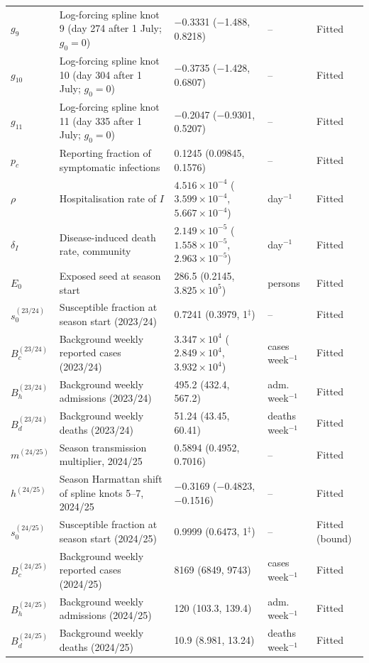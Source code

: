 \documentclass[12pt,a4paper]{article}
\theoremstyle{definition}
\theoremstyle{remark}
\begin{document}
\begin{longtable}{p{1.5cm}p{4.6cm}p{4.3cm}p{1.9cm}p{2.0cm}}
$g_{9}$ & Log-forcing spline knot 9 (day 274 after 1 July; $g_0=0$) & $-$0.3331 ($-$1.488, 0.8218) & -- & Fitted\\
$g_{10}$ & Log-forcing spline knot 10 (day 304 after 1 July; $g_0=0$) & $-$0.3735 ($-$1.428, 0.6807) & -- & Fitted\\
$g_{11}$ & Log-forcing spline knot 11 (day 335 after 1 July; $g_0=0$) & $-$0.2047 ($-$0.9301, 0.5207) & -- & Fitted\\
$p_c$ & Reporting fraction of symptomatic infections & 0.1245 (0.09845, 0.1576) & -- & Fitted\\
$\rho$ & Hospitalisation rate of $I$ & $4.516\times10^{-4}$ ($3.599\times10^{-4}$, $5.667\times10^{-4}$) & day$^{-1}$ & Fitted\\
$\delta_I$ & Disease-induced death rate, community & $2.149\times10^{-5}$ ($1.558\times10^{-5}$, $2.963\times10^{-5}$) & day$^{-1}$ & Fitted\\
$E_0$ & Exposed seed at season start & 286.5 (0.2145, $3.825\times10^{5}$) & persons & Fitted\\
$s_0^{(23/24)}$ & Susceptible fraction at season start (2023/24) & 0.7241 (0.3979, 1$^{\ddagger}$) & -- & Fitted\\
$B_c^{(23/24)}$ & Background weekly reported cases (2023/24) & $3.347\times10^{4}$ ($2.849\times10^{4}$, $3.932\times10^{4}$) & cases week$^{-1}$ & Fitted\\
$B_h^{(23/24)}$ & Background weekly admissions (2023/24) & 495.2 (432.4, 567.2) & adm. week$^{-1}$ & Fitted\\
$B_d^{(23/24)}$ & Background weekly deaths (2023/24) & 51.24 (43.45, 60.41) & deaths week$^{-1}$ & Fitted\\
$m^{(24/25)}$ & Season transmission multiplier, 2024/25 & 0.5894 (0.4952, 0.7016) & -- & Fitted\\
$h^{(24/25)}$ & Season Harmattan shift of spline knots 5--7, 2024/25 & $-$0.3169 ($-$0.4823, $-$0.1516) & -- & Fitted\\
$s_0^{(24/25)}$ & Susceptible fraction at season start (2024/25) & 0.9999 (0.6473, 1$^{\ddagger}$) & -- & Fitted (bound)\\
$B_c^{(24/25)}$ & Background weekly reported cases (2024/25) & 8169 (6849, 9743) & cases week$^{-1}$ & Fitted\\
$B_h^{(24/25)}$ & Background weekly admissions (2024/25) & 120 (103.3, 139.4) & adm. week$^{-1}$ & Fitted\\
$B_d^{(24/25)}$ & Background weekly deaths (2024/25) & 10.9 (8.981, 13.24) & deaths week$^{-1}$ & Fitted\\

\end{longtable}
\end{document}
